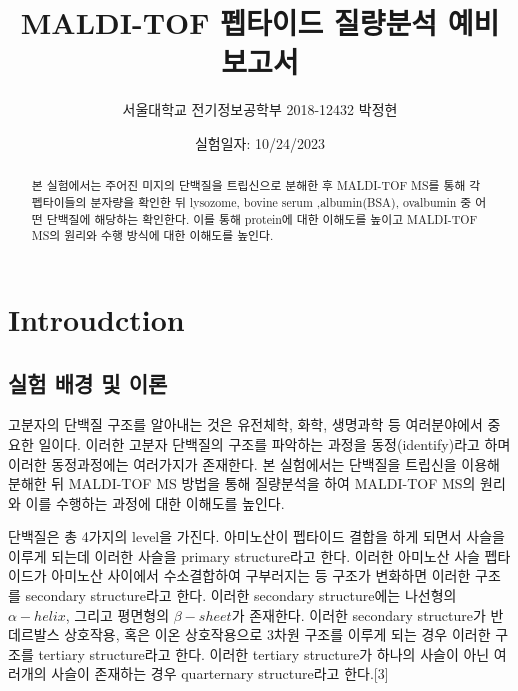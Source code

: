 \documentclass[%
 reprint,
 amsmath,amssymb,
 aps,
]{revtex4-2}
\begin{document}
\title{MALDI-TOF 펩타이드 질량분석 예비보고서}

\author{서울대학교 전기정보공학부 2018-12432 박정현}
\date{실험일자: 10/24/2023}%

\begin{abstract}
본 실험에서는 주어진 미지의 단백질을 트립신으로 분해한 후 MALDI-TOF MS를 통해 각 펩타이들의 분자량을 확인한 뒤 lysozome, bovine serum ,albumin(BSA), ovalbumin 중 어떤 단백질에 해당하는 확인한다. 이를 통해 protein에 대한 이해도를 높이고 MALDI-TOF MS의 원리와 수행 방식에 대한 이해도를 높인다.
\end{abstract}

\maketitle


\section{\label{sec:level1}Introudction}
\subsection{\label{sec:level2}실험 배경 및 이론}
고분자의 단백질 구조를 알아내는 것은 유전체학, 화학, 생명과학 등 여러분야에서 중요한 일이다. 이러한 고분자 단백질의 구조를 파악하는 과정을 동정(identify)라고 하며 이러한 동정과정에는 여러가지가 존재한다. 본 실험에서는 단백질을 트립신을 이용해 분해한 뒤 MALDI-TOF MS 방법을 통해 질량분석을 하여 MALDI-TOF MS의 원리와 이를 수행하는 과정에 대한 이해도를 높인다.

단백질은 총 4가지의 level을 가진다. 아미노산이 펩타이드 결합을 하게 되면서 사슬을 이루게 되는데 이러한 사슬을 primary structure라고 한다. 이러한 아미노산 사슬 펩타이드가 아미노산 사이에서 수소결합하여 구부러지는 등 구조가 변화하면 이러한 구조를 secondary structure라고 한다. 이러한 secondary structure에는 나선형의 $\alpha-helix$, 그리고 평면형의 $\beta-sheet$가 존재한다. 이러한 secondary structure가 반데르발스 상호작용, 혹은 이온 상호작용으로 3차원 구조를 이루게 되는 경우 이러한 구조를 tertiary structure라고 한다. 이러한 tertiary structure가 하나의 사슬이 아닌 여러개의 사슬이 존재하는 경우 quarternary structure라고 한다.[3]
\end{document}
